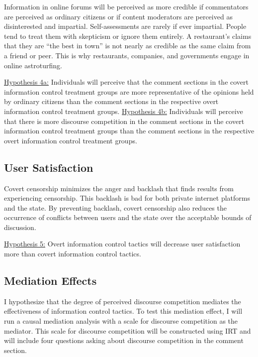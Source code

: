 \documentclass[11pt]{article}
\begin{document}
Information in online forums will be perceived as more credible if commentators are perceived as ordinary citizens or if content moderators are perceived as disinterested and impartial. Self-assessments are rarely if ever impartial. People tend to treat them with skepticism or ignore them entirely. A restaurant's claims that they are ``the best in town'' is not nearly as credible as the same claim from a friend or peer. This is why restaurants, companies, and governments engage in online astroturfing.\newline

\noindent\underline{Hypothesis 4a:} Individuals will perceive that the comment sections in the covert information control treatment groups are more representative of the opinions held by ordinary citizens than the comment sections in the respective overt information control treatment groups.
\noindent\underline{Hypothesis 4b:} Individuals will perceive that there is more discourse competition in the comment sections in the covert information control treatment groups than the comment sections in the respective overt information control treatment groups.

\subsection{User Satisfaction}

Covert censorship minimizes the anger and backlash that \cite{roberts2018censored} finds results from experiencing censorship. This backlash is bad for both private internet platforms and the state. By preventing backlash, covert censorship also reduces the occurrence of conflicts between users and the state over the acceptable bounds of discussion.\newline

\noindent\underline{Hypothesis 5:} Overt information control tactics will decrease user satisfaction more than covert information control tactics.

\subsection{Mediation Effects}

I hypothesize that the degree of perceived discourse competition mediates the effectiveness of information control tactics. To test this mediation effect, I will run a causal mediation analysis with a scale for discourse competition as the mediator. This scale for discourse competition will be constructed using IRT and will include four questions asking about discourse competition in the comment section.\\
\end{document}
